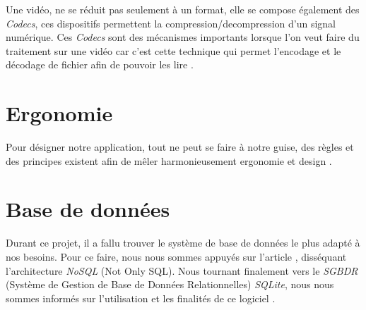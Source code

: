 Une vidéo, ne se réduit pas seulement à un format, elle se compose également des \textit{Codecs}, ces dispositifs permettent la compression/decompression d'un signal numérique. Ces \textit{Codecs} sont des mécanismes importants lorsque l'on veut faire du traitement sur une vidéo car c'est cette technique qui permet l'encodage et le décodage de fichier afin de pouvoir les lire \cite{ghanbari1999video} \cite{he2013introduction}.
\section{Ergonomie}
Pour désigner notre application, tout ne peut se faire à notre guise, des règles et des principes existent afin de mêler harmonieusement ergonomie et design \cite{lente2014scenariser}.

\section{Base de données}

Durant ce projet, il a fallu trouver le système de base de données le plus adapté à nos besoins. Pour ce faire, nous nous sommes appuyés sur l'article \cite{strauchnosql}, disséquant l'architecture \textit{NoSQL} (Not Only SQL).
Nous tournant finalement vers le \textit{SGBDR} (Système de Gestion de Base de Données Relationnelles) \textit{SQLite}, nous nous sommes informés sur l'utilisation et les finalités de ce logiciel \cite{kreibich2010using}.

